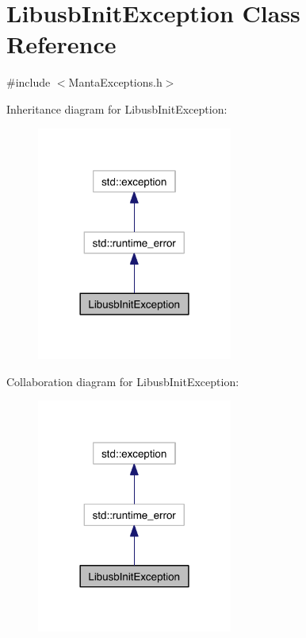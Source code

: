 \hypertarget{classLibusbInitException}{\section{\-Libusb\-Init\-Exception \-Class \-Reference}
\label{classLibusbInitException}
}


{\ttfamily \#include $<$\-Manta\-Exceptions.\-h$>$}



\-Inheritance diagram for \-Libusb\-Init\-Exception\-:\nopagebreak
\begin{figure}[H]
\begin{center}
\leavevmode
\includegraphics[width=182pt]{classLibusbInitException__inherit__graph}
\end{center}
\end{figure}


\-Collaboration diagram for \-Libusb\-Init\-Exception\-:\nopagebreak
\begin{figure}[H]
\begin{center}
\leavevmode
\includegraphics[width=182pt]{classLibusbInitException__coll__graph}
\end{center}
\end{figure}
